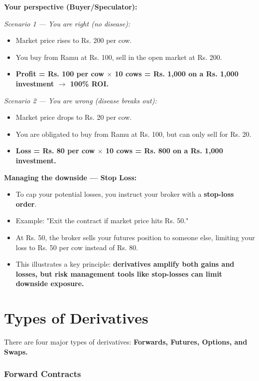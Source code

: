 \documentclass[12pt,openany]{book}
\begin{document}
\textbf{Your perspective (Buyer/Speculator):}

\emph{Scenario 1 --- You are right (no disease):}
\begin{itemize}[leftmargin=*]
    \item Market price rises to Rs. 200 per cow.
    \item You buy from Ramu at Rs. 100, sell in the open market at Rs. 200.
    \item \textbf{Profit = Rs. 100 per cow $\times$ 10 cows = Rs. 1,000 on a Rs. 1,000 investment $\rightarrow$ 100\% ROI.}
\end{itemize}

\emph{Scenario 2 --- You are wrong (disease breaks out):}
\begin{itemize}[leftmargin=*]
    \item Market price drops to Rs. 20 per cow.
    \item You are obligated to buy from Ramu at Rs. 100, but can only sell for Rs. 20.
    \item \textbf{Loss = Rs. 80 per cow $\times$ 10 cows = Rs. 800 on a Rs. 1,000 investment.}
\end{itemize}

\textbf{Managing the downside --- Stop Loss:}
\begin{itemize}[leftmargin=*]
    \item To cap your potential losses, you instruct your broker with a \textbf{stop-loss order}.
    \item Example: "Exit the contract if market price hits Rs. 50."
    \item At Rs. 50, the broker sells your futures position to someone else, limiting your loss to Rs. 50 per cow instead of Rs. 80.
    \item This illustrates a key principle: \textbf{derivatives amplify both gains and losses, but risk management tools like stop-losses can limit downside exposure.}
\end{itemize}

\section{Types of Derivatives}

There are four major types of derivatives: \textbf{Forwards, Futures, Options, and Swaps.}

\subsubsection{Forward Contracts}
\end{document}
